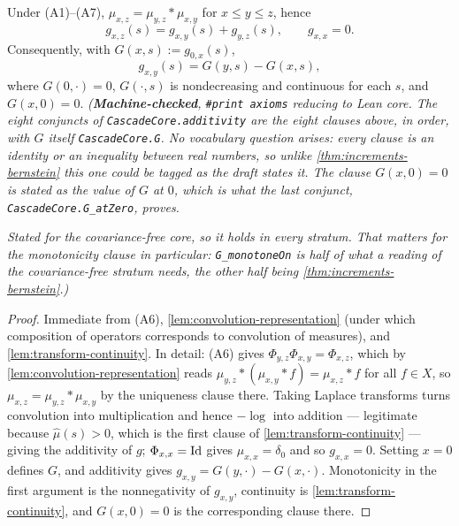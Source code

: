 \begin{lemma}[additivity]\label{lem:additivity}
\leanok
Under (A1)--(A7), $\mu_{x,z} = \mu_{y,z} * \mu_{x,y}$ for $x \le y \le z$, hence
\[
  g_{x,z}(s) = g_{x,y}(s) + g_{y,z}(s), \qquad g_{x,x} = 0.
\]
Consequently, with $G(x, s) := g_{0,x}(s)$,
\[
  g_{x,y}(s) = G(y, s) - G(x, s),
\]
where $G(0, \cdot) = 0$, $G(\cdot, s)$ is nondecreasing and continuous for each $s$, and
$G(x, 0) = 0$.
\statusT\quad\emph{(\textbf{Machine-checked}, \texttt{\#print axioms} reducing to Lean core.
The eight conjuncts of \texttt{CascadeCore.additivity} are the eight clauses above, in order,
with $G$ itself \texttt{CascadeCore.G}. No vocabulary question arises: every clause is an
identity or an inequality between real numbers, so unlike \ref{thm:increments-bernstein} this
one could be tagged as the draft states it. The clause $G(x, 0) = 0$ is stated as the value of
$G$ at $0$, which is what the last conjunct, \texttt{CascadeCore.G\_atZero}, proves.}

\emph{Stated for the covariance-free core, so it holds in every stratum. That matters for the
monotonicity clause in particular: \texttt{G\_monotoneOn} is half of what a reading of the
covariance-free stratum needs, the other half being \ref{thm:increments-bernstein}.)}
\end{lemma}

\begin{proof}
\leanok
Immediate from (A6), \ref{lem:convolution-representation} (under which composition of
operators corresponds to convolution of measures), and \ref{lem:transform-continuity}. In
detail: (A6) gives $\Phi_{y,z}\Phi_{x,y} = \Phi_{x,z}$, which by
\ref{lem:convolution-representation} reads $\mu_{y,z} * (\mu_{x,y} * f) = \mu_{x,z} * f$ for
all $f \in X$, so $\mu_{x,z} = \mu_{y,z} * \mu_{x,y}$ by the uniqueness clause there. Taking
Laplace transforms turns convolution into multiplication and hence $-\log$ into addition ---
legitimate because $\hat\mu(s) > 0$, which is the first clause of
\ref{lem:transform-continuity} --- giving the additivity of $g$;
$\Phi_{x,x} = \mathrm{Id}$ gives $\mu_{x,x} = \delta_0$ and so
$g_{x,x} = 0$. Setting $x = 0$ defines $G$, and additivity gives
$g_{x,y} = G(y,\cdot) - G(x,\cdot)$. Monotonicity in the first argument is the nonnegativity
of $g_{x,y}$, continuity is \ref{lem:transform-continuity}, and $G(x,0) = 0$ is the
corresponding clause there.
\end{proof}

